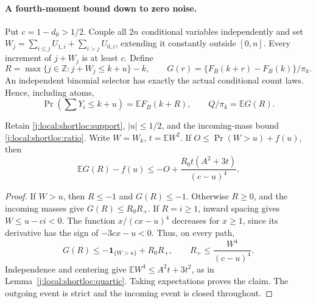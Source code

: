 \paragraph{A fourth-moment bound down to zero noise.}
\label{j:local:joint-count}
Put $c=1-d_0>1/2$. Couple all $2n$ conditional variables independently and
set $W_j=\sum_{i\le j}U_{1,i}+\sum_{i>j}U_{0,i}$, extending it constantly
outside $[0,n]$. Every increment of $j+W_j$ is at least $c$. Define
\[
 R=\max\{j\in\mathbb Z:j+W_j\le k+u\}-k,\qquad
 G(r)=\{F_B(k+r)-F_B(k)\}/\pi_k.
\]
An independent binomial selector has exactly the actual conditional count
laws. Hence, including atoms,
\begin{equation}\label{j:local:shortloc:cutoff}
 \Pr(\textstyle\sum Y_i\le k+u)=\mathbb EF_B(k+R),
 \qquad Q/\pi_k=\mathbb EG(R).
\end{equation}

\begin{lemma}\label{j:local:joint-count-moments}
Retain \eqref{j:local:shortloc:support}, $|u|\le1/2$, and the incoming-mass
bound \eqref{j:local:shortloc:ratio}. Write $W=W_k$, $t=\mathbb EW^2$.
If $O\le\Pr(W>u)+f(u)$, then
\begin{equation}\label{j:local:joint-count-gate}
 \mathbb EG(R)-f(u)\le -O+
                \frac{R_0t(A^2+3t)}{(c-u)^4}.
\end{equation}
\end{lemma}
\begin{proof}
If $W>u$, then $R\le-1$ and $G(R)\le-1$. Otherwise $R\ge0$, and the
incoming masses give $G(R)\le R_0R_+$. If $R=i\ge1$, inward spacing gives
$W\le u-ci<0$. The function $x/(cx-u)^4$ decreases for $x\ge1$, since
its derivative has the sign of $-3cx-u<0$. Thus, on every path,
\[
 G(R)\le-\mathbf1_{\{W>u\}}+R_0R_+,
 \qquad R_+\le\frac{W^4}{(c-u)^4}.
\]
Independence and centering give $\mathbb EW^4\le A^2t+3t^2$, as in
Lemma~\ref{j:local:shortloc:quartic}. Taking expectations proves the claim.
The outgoing event is strict and the incoming event is closed throughout.
\end{proof}

